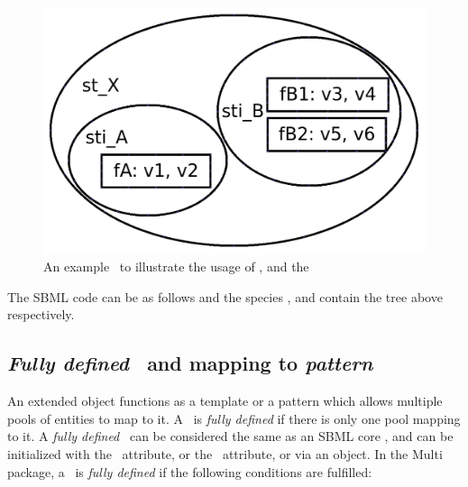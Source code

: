 \begin{figure}[htb]
  \begin{center}
    \includegraphics[scale=0.22]{./figs/diagram_ListOfSpeciesFeatures.png}
    \caption{An example \speciesFeatureType\ to illustrate the usage of \ListOfSpeciesFeatures, \SubListOfSpeciesFeatures and the \SpeciesFeature}
  \label{fig:ListOfSpeciesFeaturesExample}
  \end{center}
\end{figure}

The SBML code can be as follows and the species ,  and  contain the tree  above respectively.


\clearpage

\subsection{\emph{Fully defined} \species\ and mapping to \emph{pattern} \species}
\label{def:Species:FullyDefined}

An extended \ExSpecies object functions as a template or a pattern which allows multiple pools of entities to map to it. A \species\ is \emph{fully defined} if there is only one pool mapping to it. A \emph{fully defined} \species\ can be considered the same as an SBML core \species, and can be initialized with the \initialAmountAtt\ attribute, or the \initialConcentrationAtt\ attribute, or via an \InitialAssignment object. In the Multi package, a \species\ is \emph{fully defined} if the following conditions are fulfilled:

